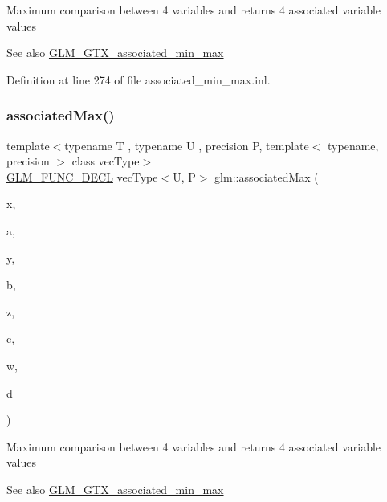 Maximum comparison between 4 variables and returns 4 associated variable values \begin{DoxySeeAlso}{See also}
\mbox{\hyperlink{group__gtx__associated__min__max}{G\+L\+M\+\_\+\+G\+T\+X\+\_\+associated\+\_\+min\+\_\+max}} 
\end{DoxySeeAlso}


Definition at line 274 of file associated\+\_\+min\+\_\+max.\+inl.

\mbox{\label{group__gtx__associated__min__max_gaf607886421c35cd7e4f41a50d7c330e3}} 
\subsubsection{\texorpdfstring{associatedMax()}{associatedMax()}\hspace{0.1cm}{\footnotesize\ttfamily [10/12]}}
{\footnotesize\ttfamily template$<$typename T , typename U , precision P, template$<$ typename, precision $>$ class vec\+Type$>$ \\
\mbox{\hyperlink{setup_8hpp_ab2d052de21a70539923e9bcbf6e83a51}{G\+L\+M\+\_\+\+F\+U\+N\+C\+\_\+\+D\+E\+CL}} vec\+Type$<$U, P$>$ glm\+::associated\+Max (\begin{DoxyParamCaption}\item[{vec\+Type$<$ T, P $>$ const \&}]{x,  }\item[{vec\+Type$<$ U, P $>$ const \&}]{a,  }\item[{vec\+Type$<$ T, P $>$ const \&}]{y,  }\item[{vec\+Type$<$ U, P $>$ const \&}]{b,  }\item[{vec\+Type$<$ T, P $>$ const \&}]{z,  }\item[{vec\+Type$<$ U, P $>$ const \&}]{c,  }\item[{vec\+Type$<$ T, P $>$ const \&}]{w,  }\item[{vec\+Type$<$ U, P $>$ const \&}]{d }\end{DoxyParamCaption})}

Maximum comparison between 4 variables and returns 4 associated variable values \begin{DoxySeeAlso}{See also}
\mbox{\hyperlink{group__gtx__associated__min__max}{G\+L\+M\+\_\+\+G\+T\+X\+\_\+associated\+\_\+min\+\_\+max}} 
\end{DoxySeeAlso}



